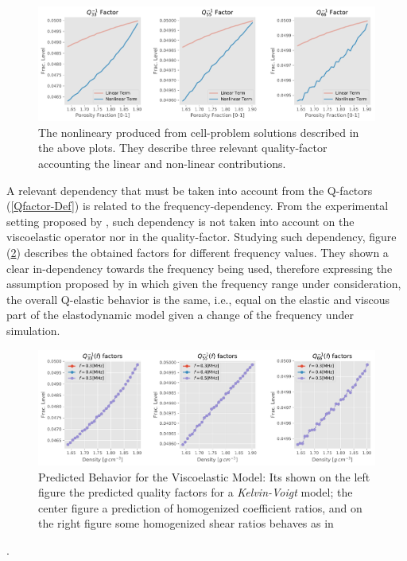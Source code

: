 \begin{figure}[!h]
	\centering
	\includegraphics[width=\textwidth]{images/Qfactors/PlotsVisc_Circular2DPart50EPS5-2_Ome05.pdf}
	\caption{The nonlineary produced from cell-problem solutions described in the above plots. They describe three relevant quality-factor accounting the linear and non-linear contributions.}
	\label{QfactorDecomposition}
\end{figure} 

A relevant dependency that must be taken into account from the Q-factors (\ref{Qfactor-Def}) is related to the frequency-dependency. From the experimental setting proposed by \cite{Bernard2015}, such dependency is not taken into account on the viscoelastic operator nor in the quality-factor. 
Studying such dependency, figure (\ref{BernardPrediction-Freq}) describes the obtained factors for different frequency values. They shown a clear in-dependency towards the frequency being used, therefore expressing the assumption proposed by \cite{Bernard2015} in which given the frequency range under consideration, the overall Q-elastic behavior is the same, i.e., equal on the elastic and viscous part of the elastodynamic model given a change of the frequency under simulation.
\begin{figure}[!h]
	\centering
	\includegraphics[width=\textwidth]{images/Qfactors/QfactorsFreqsEPS5-2.pdf}
	\caption{Predicted Behavior for the Viscoelastic Model: Its shown on the left figure the predicted quality factors for a \textit{Kelvin-Voigt} model; the center figure a prediction of homogenized coefficient ratios, and on the right figure some homogenized shear ratios behaves as in \cite{Bernard2015} }
	\label{BernardPrediction-Freq}
\end{figure}.






